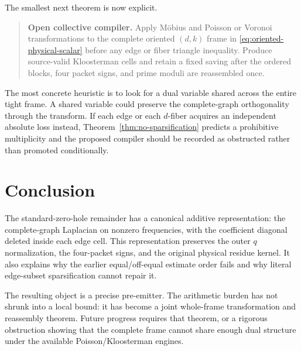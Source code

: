 \documentclass[11pt]{article}
\begin{document}
The smallest next theorem is now explicit.

\begin{quote}
\textbf{Open collective compiler.}
Apply Möbius and Poisson or Voronoi transformations to the complete oriented
$(d,k)$ frame in \eqref{eq:oriented-physical-scalar} before any edge or fiber
triangle inequality.  Produce source-valid Kloosterman cells and retain a
fixed saving after the ordered blocks, four packet signs, and prime moduli are
reassembled once.
\end{quote}

The most concrete heuristic is to look for a dual variable shared across the
entire tight frame.  A shared variable could preserve the complete-graph
orthogonality through the transform.  If each edge or each $d$-fiber acquires
an independent absolute loss instead, Theorem~\ref{thm:no-sparsification}
predicts a prohibitive multiplicity and the proposed compiler should be
recorded as obstructed rather than promoted conditionally.

\section{Conclusion}

The standard-zero-hole remainder has a canonical additive representation:
the complete-graph Laplacian on nonzero frequencies, with the coefficient
diagonal deleted inside each edge cell.  This representation preserves the
outer $q$ normalization, the four-packet signs, and the original physical
residue kernel.  It also explains why the earlier equal/off-equal estimate
order fails and why literal edge-subset sparsification cannot repair it.

The resulting object is a precise pre-emitter.  The arithmetic burden has not
shrunk into a local bound: it has become a joint whole-frame transformation
and reassembly theorem.  Future progress requires that theorem, or a rigorous
obstruction showing that the complete frame cannot share enough dual
structure under the available Poisson/Kloosterman engines.



\end{document}
